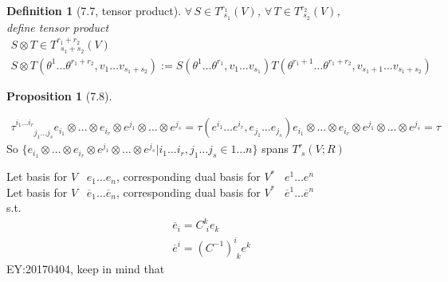 \documentclass[10pt]{amsart}
\newtheorem{proposition}{Proposition}
\newtheorem{definition}{Definition}
\newcommand{\exercisehead}[1]
  { \smallskip
   \noindent{\small\bf Exercise #1.}
  }
\begin{document}
\begin{multicols*}{2}
\begin{definition}[7.7\cite{JLee2009}, tensor product]
$\forall \, S\in T^{r_1}_{ \,\, s_1}(V)$, $\forall \, T \in T^{r_2}_{ \,\, s_2}(V)$, \\
define tensor product 
\begin{equation}
\begin{gathered}
S\otimes T\in T^{r_1+r_2}_{ \, \, \, s_1+s_2}(V) \\
	S\otimes T( \theta^1\dots \theta^{r_1 + r_2}, v_1 \dots v_{s_1+s_2}) := S(\theta^1\dots \theta^{r_1}, v_1\dots v_{s_1})T(\theta^{r_1+1}\dots \theta^{r_1+r_2}, v_{s_1+1}\dots v_{s_1 + s_2} )
\end{gathered}
\end{equation}
\end{definition}

\begin{proposition}[7.8\cite{JLee2009}]
\end{proposition}







\[
\begin{gathered}
	\tau^{ i_1 \dots i_r }_{ \phantom{i_1 \dots i_r} j_1 \dots j_s} e_{i_1} \otimes \dots \otimes e_{i_r} \otimes e^{j_1}\otimes \dots \otimes e^{j_s} = \tau(e^{i_1} \dots e^{i_r}, e_{j_1} \dots e_{j_s} )e_{i_1} \otimes \dots \otimes e_{i_r} \otimes e^{j_1} \otimes \dots \otimes e^{j_s} = \tau 
\end{gathered}
\]
So $\lbrace e_{i_1}\otimes \dots \otimes e_{i_r} \otimes e^{j_1} \otimes \dots \otimes e^{j_s} | i_1 \dots i_{r}, j_1\dots j_s \in 1 \dots n \rbrace$ spans $T^r_{\,\, s}(V;R)$

\exercisehead{7.11}  Let basis for $V$ \, $e_1 \dots e_n$, corresponding dual basis for $V^*$ \,  $e^1 \dots e^n$ \\ 
Let basis for $V$ \, $\overline{e}_1 \dots \overline{e}_n$, corresponding dual basis for $V^*$ \,  $\overline{e}^1 \dots \overline{e}^n$ \\
s.t. 
\[
\begin{aligned}
	& \overline{e}_i = C^k_{ \,\, i} e_k \\
	& \overline{e}^i = (C^{-1})^i_{ \, \, k} e^k
\end{aligned}
\]
EY:20170404, keep in mind that
 

\end{multicols*}
\end{document}
